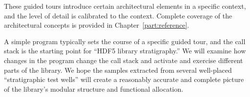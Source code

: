 
These guided tours introduce certain architectural elements in a specific context, and the level of detail is calibrated to the context. Complete coverage of the architectural concepts is provided in Chapter~\ref{part:reference}.

A simple program typically sets the course of a specific guided tour, and the call stack is the starting point for ``HDF5 library stratigraphy.'' We will examine how changes in the program change the call stack and activate and exercise different parts of the library. We hope the samples extracted from several well-placed ``stratigraphic test wells'' will create a reasonably accurate and complete picture of the library's modular structure and functional allocation.